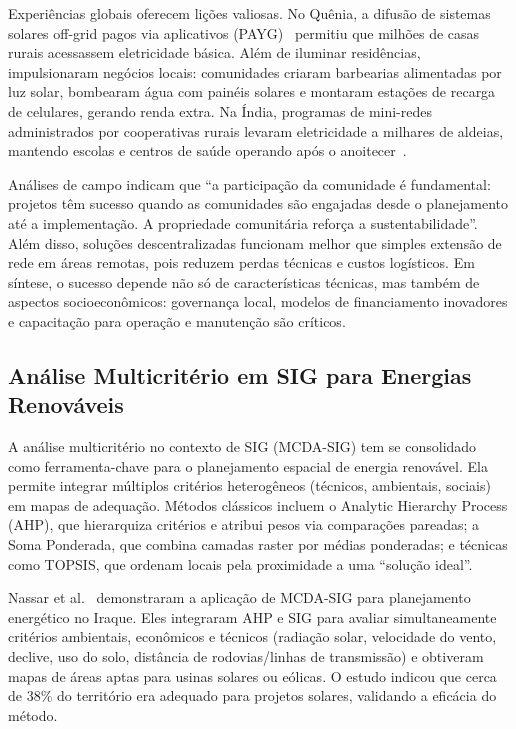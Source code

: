\documentclass[12pt, a4paper]{article}
\begin{document}
Experiências globais oferecem lições valiosas. No Quênia, a difusão de sistemas solares off-grid pagos via aplicativos (PAYG)~\citep{Onyango2022} permitiu que milhões de casas rurais acessassem eletricidade básica. Além de iluminar residências, impulsionaram negócios locais: comunidades criaram barbearias alimentadas por luz solar, bombearam água com painéis solares e montaram estações de recarga de celulares, gerando renda extra. Na Índia, programas de mini-redes administrados por cooperativas rurais levaram eletricidade a milhares de aldeias, mantendo escolas e centros de saúde operando após o anoitecer~\citep{Mapako2021}.

Análises de campo indicam que ``a participação da comunidade é fundamental: projetos têm sucesso quando as comunidades são engajadas desde o planejamento até a implementação. A propriedade comunitária reforça a sustentabilidade''. Além disso, soluções descentralizadas funcionam melhor que simples extensão de rede em áreas remotas, pois reduzem perdas técnicas e custos logísticos. Em síntese, o sucesso depende não só de características técnicas, mas também de aspectos socioeconômicos: governança local, modelos de financiamento inovadores e capacitação para operação e manutenção são críticos.

\subsection{Análise Multicritério em SIG para Energias Renováveis}

A análise multicritério no contexto de SIG (MCDA-SIG) tem se consolidado como ferramenta-chave para o planejamento espacial de energia renovável. Ela permite integrar múltiplos critérios heterogêneos (técnicos, ambientais, sociais) em mapas de adequação. Métodos clássicos incluem o Analytic Hierarchy Process (AHP), que hierarquiza critérios e atribui pesos via comparações pareadas; a Soma Ponderada, que combina camadas raster por médias ponderadas; e técnicas como TOPSIS, que ordenam locais pela proximidade a uma ``solução ideal''.

Nassar et al.~\citep{Nassar2025} demonstraram a aplicação de MCDA-SIG para planejamento energético no Iraque. Eles integraram AHP e SIG para avaliar simultaneamente critérios ambientais, econômicos e técnicos (radiação solar, velocidade do vento, declive, uso do solo, distância de rodovias/linhas de transmissão) e obtiveram mapas de áreas aptas para usinas solares ou eólicas. O estudo indicou que cerca de 38\% do território era adequado para projetos solares, validando a eficácia do método.
\end{document}
